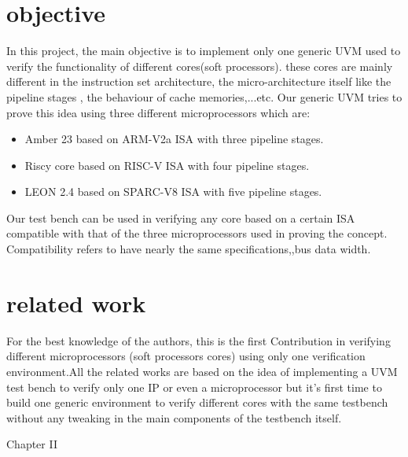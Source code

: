 \documentclass[conference,10 pt,twoside]{IEEEtran}
\begin{document}
\section{objective}
In this project, the main objective is to implement  only one generic UVM used to verify the functionality of different cores(soft processors).  these cores are mainly different in the instruction set architecture, the micro-architecture itself like the pipeline stages , the behaviour of cache memories,...etc.
Our generic UVM tries to prove this idea using three different microprocessors which are:
\begin{itemize}
\item Amber 23 based on ARM-V2a ISA with three pipeline stages.
\item Riscy core based on RISC-V ISA with four pipeline stages.
\item LEON 2.4 based on SPARC-V8 ISA with five pipeline stages.

\end{itemize}
Our test bench can be used in verifying any core based on a certain ISA compatible with that of the three microprocessors used in proving the concept. Compatibility refers to have nearly the same specifications,,bus data width.
\section{related work}

For the best knowledge of the authors, this is the first Contribution in verifying different microprocessors (soft processors cores) using only one  verification environment.All the related works are based on the idea of implementing a UVM test bench to verify only one IP or even a microprocessor but it's first time to build one generic environment to verify different cores with the same testbench without any tweaking in the main components of the testbench itself.

Chapter II
\end{document}

